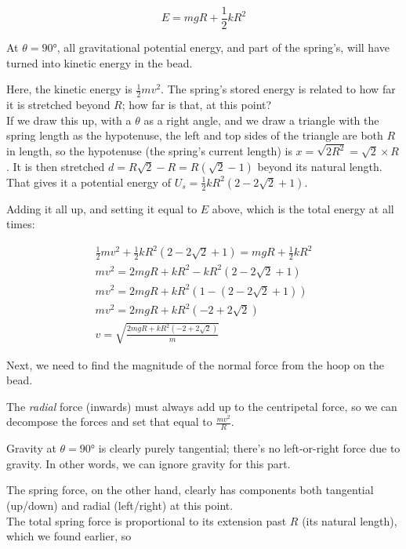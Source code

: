 \documentclass[12pt,a4paper]{report}
\begin{document}
\begin{equation}
E = m g R + \frac{1}{2} k R^2
\end{equation}

At $\theta = \ang{90}$, all gravitational potential energy, and part of the spring's, will have turned into kinetic energy in the bead.

Here, the kinetic energy is $\frac{1}{2} m v^2$. The spring's stored energy is related to how far it is stretched beyond $R$; how far is that, at this point?\\
If we draw this up, with a $\theta$ as a right angle, and we draw a triangle with the spring length as the hypotenuse, the left and top sides of the triangle are both $R$ in length, so the hypotenuse (the spring's current length) is $x = \sqrt{2 R^2} = \sqrt{2} \times R$.
It is then stretched $d = R \sqrt{2} - R = R(\sqrt{2} - 1)$ beyond its natural length. That gives it a potential energy of $U_s = \frac{1}{2} k R^2(2 - 2 \sqrt{2} + 1)$.

Adding it all up, and setting it equal to $E$ above, which is the total energy at all times:

\begin{align}
\frac{1}{2} m v^2 + \frac{1}{2} k R^2(2 - 2 \sqrt{2} + 1) = m g R + \frac{1}{2} k R^2\\
m v^2 = 2 m g R + k R^2 - k R^2(2 - 2 \sqrt{2} + 1)\\
m v^2 = 2 m g R + k R^2 (1 - (2 - 2 \sqrt{2} + 1))\\
m v^2 = 2 m g R + k R^2 (-2 + 2 \sqrt{2})\\
v = \sqrt{\frac{2 m g R + k R^2 (-2 + 2 \sqrt{2})}{m}}
\end{align}

Next, we need to find the magnitude of the normal force from the hoop on the bead.

The \emph{radial} force (inwards) must always add up to the centripetal force, so we can decompose the forces and set that equal to $\frac{m v^2}{R}$.

Gravity at $\theta = \ang{90}$ is clearly purely tangential; there's no left-or-right force due to gravity. In other words, we can ignore gravity for this part.

The spring force, on the other hand, clearly has components both tangential (up/down) and radial (left/right) at this point.\\
The total spring force is proportional to its extension past $R$ (its natural length), which we found earlier, so
\end{document}
